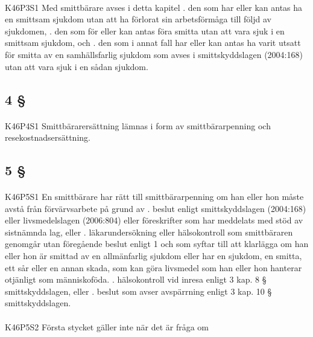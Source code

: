 \documentclass[a4paper,notitlepage,openany,10pt]{book}
\begin{document}
\paragraph*{}
{\tiny K46P3S1}
Med smittbärare avses i detta kapitel
. den som har eller kan antas ha en smittsam sjukdom utan att ha förlorat sin arbetsförmåga till följd av sjukdomen,
. den som för eller kan antas föra smitta utan att vara sjuk i en smittsam sjukdom, och
. den som i annat fall har eller kan antas ha varit utsatt för smitta av en samhällsfarlig sjukdom som avses i smittskyddslagen (2004:168) utan att vara sjuk i en sådan sjukdom.
\subsection*{4 §}
\paragraph*{}
{\tiny K46P4S1}
Smittbärarersättning lämnas i form av smittbärarpenning och resekostnadsersättning.
\subsection*{5 §}
\paragraph*{}
{\tiny K46P5S1}
En smittbärare har rätt till smittbärarpenning om han eller hon måste avstå från förvärvsarbete på grund av
. beslut enligt smittskyddslagen (2004:168) eller livsmedelslagen (2006:804) eller föreskrifter som har meddelats med stöd av sistnämnda lag, eller
. läkarundersökning eller hälsokontroll som smittbäraren genomgår utan föregående beslut enligt 1 och som syftar till att klarlägga om han eller hon är smittad av en allmänfarlig sjukdom eller har en sjukdom, en smitta, ett sår eller en annan skada, som kan göra livsmedel som han eller hon hanterar otjänligt som människoföda.
. hälsokontroll vid inresa enligt 3 kap. 8 § smittskyddslagen, eller
. beslut som avser avspärrning enligt 3 kap. 10 § smittskyddslagen.
\paragraph*{}
{\tiny K46P5S2}
Första stycket gäller inte när det är fråga om
\end{document}
